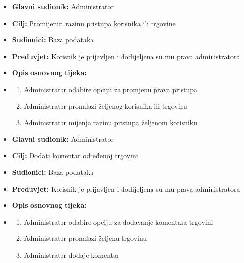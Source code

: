                         \noindent {}
					\begin{itemize}
	
						\item \textbf{Glavni sudionik: }Administrator
						\item  \textbf{Cilj:} Promijeniti razinu pristupa korisnika ili trgovine
						\item  \textbf{Sudionici:} Baza podataka
						\item  \textbf{Preduvjet:} Korisnik je prijavljen i dodijeljena su mu prava administratora
						\item  \textbf{Opis osnovnog tijeka:}
						
						\item[] \begin{enumerate}
							\item Administrator odabire opciju za promjenu prava pristupa
                                \item Administrator pronalazi željenog korisnika ili trgovinu
                                \item Administrator mijenja razinu pristupa željenom korisniku\\
						\end{enumerate}

					\end{itemize}


                        \noindent {}
					\begin{itemize}
	
						\item \textbf{Glavni sudionik: }Administrator
						\item  \textbf{Cilj:} Dodati komentar određenoj trgovini
						\item  \textbf{Sudionici:} Baza podataka
						\item  \textbf{Preduvjet:} Korisnik je prijavljen i dodijeljena su mu prava administratora
						\item  \textbf{Opis osnovnog tijeka:}
						
						\item[] \begin{enumerate}
							\item Administrator odabire opciju za dodavanje komentara trgovini
                                \item Administrator pronalazi željenu trgovinu
                                \item Administrator dodaje komentar\\
						\end{enumerate}

					\end{itemize}


